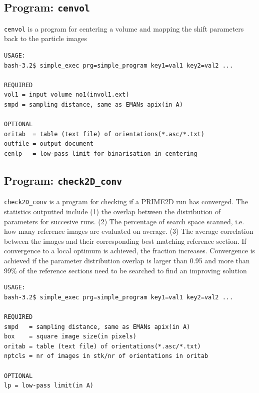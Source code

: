 \documentclass[a4paper,11pt]{article}
\newcommand{\prgname}[1]{\textcolor{NavyBlue}{\texttt{#1}}}
\begin{document}
\subsection{Program: \prgname{cenvol}}
\label{cenvol}
\prgname{cenvol} is a program for centering a volume and mapping the shift parameters back to the particle images

\begin{verbatim}
USAGE:
bash-3.2$ simple_exec prg=simple_program key1=val1 key2=val2 ...

REQUIRED
vol1 = input volume no1(invol1.ext)
smpd = sampling distance, same as EMANs apix(in A)

OPTIONAL
oritab  = table (text file) of orientations(*.asc/*.txt)
outfile = output document
cenlp   = low-pass limit for binarisation in centering
\end{verbatim}

\subsection{Program: \prgname{check2D\_conv}}
\label{check2D_conv}
\prgname{check2D\_conv} is a program for checking if a PRIME2D run has converged. The statistics outputted include (1) the overlap between the distribution of parameters for succesive runs. (2) The percentage of search space scanned, i.e. how many reference images are evaluated on average. (3) The average correlation between the images and their corresponding best matching reference section. If convergence to a local optimum is achieved, the fraction increases. Convergence is achieved if the parameter distribution overlap is larger than 0.95 and more than 99\% of the reference sections need to be searched to find an improving solution

\begin{verbatim}
USAGE:
bash-3.2$ simple_exec prg=simple_program key1=val1 key2=val2 ...

REQUIRED
smpd   = sampling distance, same as EMANs apix(in A)
box    = square image size(in pixels)
oritab = table (text file) of orientations(*.asc/*.txt)
nptcls = nr of images in stk/nr of orientations in oritab

OPTIONAL
lp = low-pass limit(in A)
\end{verbatim}
\end{document}

